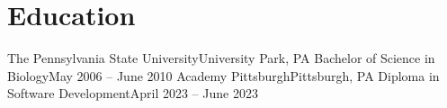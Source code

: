 \section{Education}
\resumeSubHeadingListStart
  \resumeSubheading
    {The Pennsylvania State University}{University Park, PA}
    {Bachelor of Science in Biology}{May 2006 -- June 2010}
  \resumeSubheading
    {Academy Pittsburgh}{Pittsburgh, PA}
    {Diploma in Software Development}{April 2023 -- June 2023}
\resumeSubHeadingListEnd